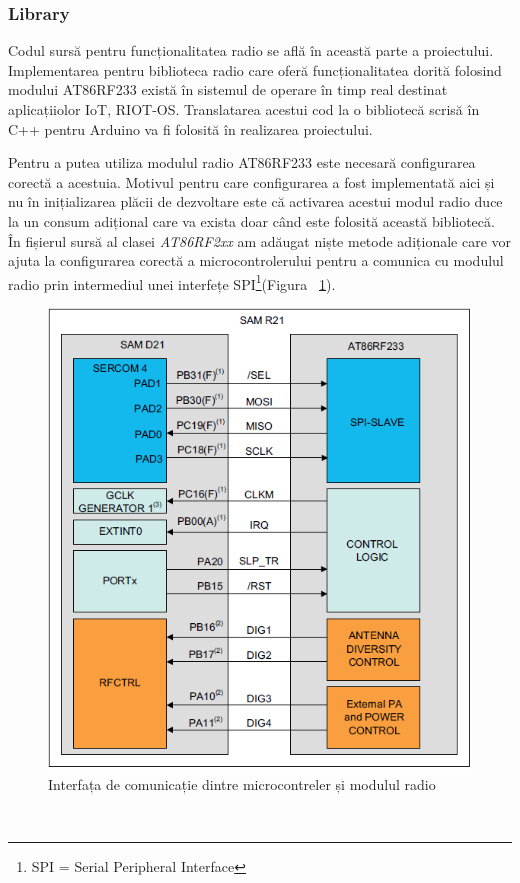 \documentclass[12pt,a4paper]{report}
\begin{document}
\subsubsection{Library}
Codul sursă pentru funcționalitatea radio se află în această parte a proiectului. Implementarea pentru biblioteca radio care oferă funcționalitatea dorită folosind modului AT86RF233 există în sistemul de operare în timp real destinat aplicațiiolor IoT, RIOT-OS. Translatarea acestui cod la o bibliotecă scrisă în C++ pentru Arduino va fi folosită în realizarea proiectului\cite{msolters}.

Pentru a putea utiliza modulul radio AT86RF233 este necesară configurarea corectă a acestuia. Motivul pentru care configurarea a fost implementată aici și nu în inițializarea plăcii de dezvoltare este că activarea acestui modul radio duce la un consum adițional care va exista doar când este folosită această bibliotecă.
În fișierul sursă al clasei \textit{AT86RF2xx} am adăugat niște metode adiționale care vor ajuta la configurarea corectă a microcontrolerului pentru a comunica cu modulul radio prin intermediul unei interfețe SPI\footnote{SPI = Serial Peripheral Interface}(Figura ~\ref{fig:spi}). 
\begin{figure}[h]
\centering
\includegraphics[scale=0.9]{pics/spi.png}
  \caption{Interfața de comunicație dintre microcontreler și modulul radio\cite{samr21ug}}
  \label{fig:spi}
\end{figure}\\
\end{document}

